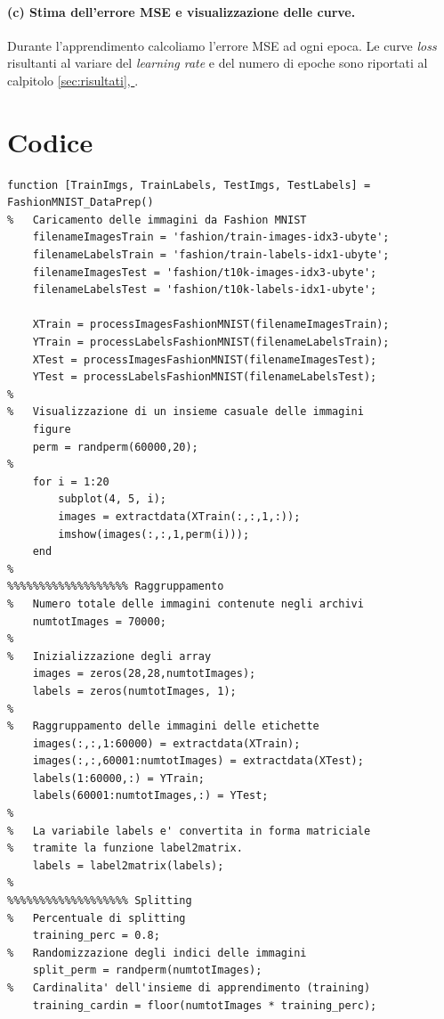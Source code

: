 \documentclass[a4paper,12pt]{article}
\renewcommand*{\fullref}[1]{\hyperref[{#1}]{\vref*{#1}, \emph{\nameref*{#1}}}}
\begin{document}
\paragraph{(c) Stima dell’errore MSE e visualizzazione delle curve.}
Durante l'apprendimento calcoliamo l'errore MSE ad ogni epoca. Le curve \emph{loss} risultanti al variare del \emph{learning rate} e del numero di epoche sono riportati al calpitolo \fullref{sec:risultati}.




\newpage
\section{Codice} %
\label{sec:codice}

\begin{lstlisting}[style=Matlab-editor,title=\texttt{FashionMNIST\_DataPrep.m},label=lst:dataprep]
function [TrainImgs, TrainLabels, TestImgs, TestLabels] = FashionMNIST_DataPrep()
%   Caricamento delle immagini da Fashion MNIST
    filenameImagesTrain = 'fashion/train-images-idx3-ubyte';
    filenameLabelsTrain = 'fashion/train-labels-idx1-ubyte';
    filenameImagesTest = 'fashion/t10k-images-idx3-ubyte';
    filenameLabelsTest = 'fashion/t10k-labels-idx1-ubyte';

    XTrain = processImagesFashionMNIST(filenameImagesTrain);
    YTrain = processLabelsFashionMNIST(filenameLabelsTrain);
    XTest = processImagesFashionMNIST(filenameImagesTest);
    YTest = processLabelsFashionMNIST(filenameLabelsTest);
%
%   Visualizzazione di un insieme casuale delle immagini
    figure
    perm = randperm(60000,20);
%
    for i = 1:20
        subplot(4, 5, i);
        images = extractdata(XTrain(:,:,1,:));
        imshow(images(:,:,1,perm(i)));
    end
%
%%%%%%%%%%%%%%%%%%% Raggruppamento
%   Numero totale delle immagini contenute negli archivi
    numtotImages = 70000;
%  
%   Inizializzazione degli array
    images = zeros(28,28,numtotImages);
    labels = zeros(numtotImages, 1);
%
%   Raggruppamento delle immagini delle etichette
    images(:,:,1:60000) = extractdata(XTrain);
    images(:,:,60001:numtotImages) = extractdata(XTest);
    labels(1:60000,:) = YTrain;
    labels(60001:numtotImages,:) = YTest;
%
%   La variabile labels e' convertita in forma matriciale
%   tramite la funzione label2matrix.   
    labels = label2matrix(labels);
%   
%%%%%%%%%%%%%%%%%%% Splitting
%   Percentuale di splitting
    training_perc = 0.8; 
%   Randomizzazione degli indici delle immagini
    split_perm = randperm(numtotImages);
%   Cardinalita' dell'insieme di apprendimento (training)
    training_cardin = floor(numtotImages * training_perc);


\end{lstlisting}
\end{document}

